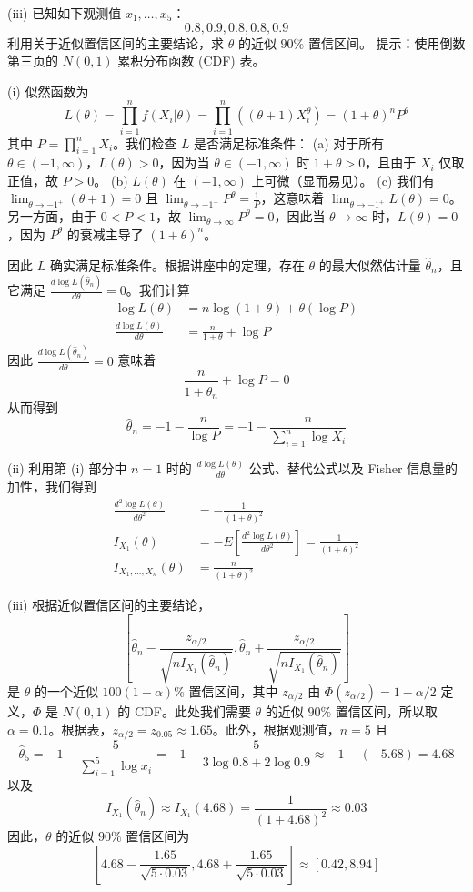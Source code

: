 \begin{questions}
(iii) 已知如下观测值 $x_1, \dots, x_5$：
\[
0.8, 0.9, 0.8, 0.8, 0.9
\]
利用关于近似置信区间的主要结论，求 $\theta$ 的近似 $90\%$ 置信区间。
提示：使用倒数第三页的 $N(0, 1)$ 累积分布函数 (CDF) 表。

\begin{solution}
(i) 似然函数为
\[
L(\theta) = \prod_{i=1}^n f(X_i|\theta) = \prod_{i=1}^n ((\theta + 1)X_i^\theta) = (1 + \theta)^n P^\theta
\]
其中 $P = \prod_{i=1}^n X_i$。我们检查 $L$ 是否满足标准条件：
(a) 对于所有 $\theta \in (-1, \infty)$，$L(\theta) > 0$，因为当 $\theta \in (-1, \infty)$ 时 $1 + \theta > 0$，且由于 $X_i$ 仅取正值，故 $P > 0$。
(b) $L(\theta)$ 在 $(-1, \infty)$ 上可微（显而易见）。
(c) 我们有 $\lim_{\theta \to -1^+} (\theta + 1) = 0$ 且 $\lim_{\theta \to -1^+} P^\theta = \frac{1}{P}$，这意味着 $\lim_{\theta \to -1^+} L(\theta) = 0$。另一方面，由于 $0 < P < 1$，故 $\lim_{\theta \to \infty} P^\theta = 0$，因此当 $\theta \to \infty$ 时，$L(\theta) = 0$，因为 $P^\theta$ 的衰减主导了 $(1 + \theta)^n$。

因此 $L$ 确实满足标准条件。根据讲座中的定理，存在 $\theta$ 的最大似然估计量 $\hat{\theta}_n$，且它满足 $\frac{d \log L(\hat{\theta}_n)}{d\theta} = 0$。我们计算
\begin{align*}
\log L(\theta) &= n \log(1 + \theta) + \theta(\log P)\\
\frac{d \log L(\theta)}{d\theta} &= \frac{n}{1 + \theta} + \log P
\end{align*}
因此 $\frac{d \log L(\hat{\theta}_n)}{d\theta} = 0$ 意味着
\[
\frac{n}{1 + \hat{\theta}_n} + \log P = 0
\]
从而得到
\[
\hat{\theta}_n = -1 - \frac{n}{\log P} = -1 - \frac{n}{\sum_{i=1}^n \log X_i}
\]

(ii) 利用第 (i) 部分中 $n = 1$ 时的 $\frac{d \log L(\theta)}{d\theta}$ 公式、替代公式以及 Fisher 信息量的加性，我们得到
\begin{align*}
\frac{d^2 \log L(\theta)}{d\theta^2} &= -\frac{1}{(1 + \theta)^2}\\
I_{X_1}(\theta) &= -E\left[\frac{d^2 \log L(\theta)}{d\theta^2}\right] = \frac{1}{(1 + \theta)^2}\\
I_{X_1, \dots, X_n}(\theta) &= \frac{n}{(1 + \theta)^2}
\end{align*}

(iii) 根据近似置信区间的主要结论，
\[
\left[ \hat{\theta}_n - \frac{z_{\alpha/2}}{\sqrt{n I_{X_1}(\hat{\theta}_n)}}, \hat{\theta}_n + \frac{z_{\alpha/2}}{\sqrt{n I_{X_1}(\hat{\theta}_n)}} \right]
\]
是 $\theta$ 的一个近似 $100(1 - \alpha)\%$ 置信区间，其中 $z_{\alpha/2}$ 由 $\Phi(z_{\alpha/2}) = 1 - \alpha/2$ 定义，$\Phi$ 是 $N(0, 1)$ 的 CDF。此处我们需要 $\theta$ 的近似 $90\%$ 置信区间，所以取 $\alpha = 0.1$。根据表，$z_{\alpha/2} = z_{0.05} \approx 1.65$。此外，根据观测值，$n = 5$ 且
\[
\hat{\theta}_5 = -1 - \frac{5}{\sum_{i=1}^5 \log x_i} = -1 - \frac{5}{3 \log 0.8 + 2 \log 0.9} \approx -1 - (-5.68) = 4.68
\]
以及
\[
I_{X_1}(\hat{\theta}_n) \approx I_{X_1}(4.68) = \frac{1}{(1 + 4.68)^2} \approx 0.03
\]
因此，$\theta$ 的近似 $90\%$ 置信区间为
\[
\left[ 4.68 - \frac{1.65}{\sqrt{5 \cdot 0.03}}, 4.68 + \frac{1.65}{\sqrt{5 \cdot 0.03}} \right] \approx [0.42, 8.94]
\]
\end{solution}


\end{questions}
